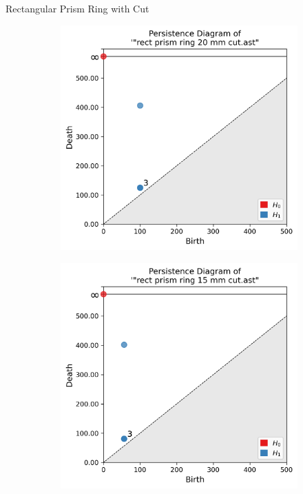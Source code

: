\documentclass[xcolor=dvipsnames, aspectratio=169]{beamer}
\begin{document}
\begin{frame}{Rectangular Prism Ring with Cut}
\begin{figure}
\begin{subfigure}[b]{0.15\textwidth}
\end{subfigure}
\begin{subfigure}[b]{0.15\textwidth}
\includegraphics[width=\linewidth]{Final Run, (rect prism ring 20 mm cut) persdia.png}
\end{subfigure}
\begin{subfigure}[b]{0.15\textwidth}
\includegraphics[width=\linewidth]{Final Run, (rect prism ring 15 mm cut) persdia.png}

\end{subfigure}
\end{figure}
\end{frame}
\end{document}
